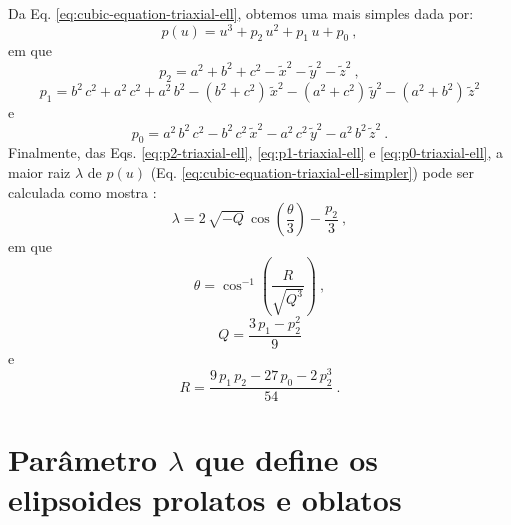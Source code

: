 Da Eq. \ref{eq:cubic-equation-triaxial-ell}, obtemos uma mais simples
dada por:
\begin{equation}
p(u) =  u^{3} + p_{2} \, u^{2} + p_{1} \, u + p_{0} \: ,
\label{eq:cubic-equation-triaxial-ell-simpler}
\end{equation}
em que
\begin{equation}
p_{2} = a^{2} + b^{2} + c^{2} - \tilde{x}^{2} - \tilde{y}^{2} - \tilde{z}^{2} \: ,
\label{eq:p2-triaxial-ell}
\end{equation}
\begin{equation}
p_{1} = b^{2} \, c^{2} + a^{2} \, c^{2} + a^{2} \, b^{2} 
- (b^{2} + c^{2}) \, \tilde{x}^{2}
- (a^{2} + c^{2}) \, \tilde{y}^{2} 
- (a^{2} + b^{2}) \, \tilde{z}^{2}
\label{eq:p1-triaxial-ell}
\end{equation}
e
\begin{equation}
p_{0} =  a^{2} \, b^{2} \, c^{2} - b^{2} \, c^{2} \, 
\tilde{x}^{2} - a^{2} \, c^{2} \, \tilde{y}^{2} - a^{2} \, 
b^{2} \, \tilde{z}^{2} \: .
\label{eq:p0-triaxial-ell}
\end{equation}
Finalmente, das Eqs. \ref{eq:p2-triaxial-ell}, 
\ref{eq:p1-triaxial-ell} e \ref{eq:p0-triaxial-ell},
a maior raiz $\lambda$ de $p(u)$ 
(Eq. \ref{eq:cubic-equation-triaxial-ell-simpler}) pode ser
calculada como mostra \citep{weisstein2017}:
\begin{equation}
\lambda = 2 \, \sqrt{-Q} \, \cos \left( \frac{\theta}{3}\right) - \frac{p_{2}}{3} \: ,
\label{eq:lambda-triaxial-ell}
\end{equation}
em que
\begin{equation}
\theta = \cos^{-1} \left( \frac{R}{\sqrt{Q^{3}}} \right) \: ,
\label{eq:theta-triaxial-ell}
\end{equation}
\begin{equation}
Q = \frac{3 \, p_{1} - p_{2}^{2}}{9}
\label{eq:Q-triaxial-ell}
\end{equation}
e
\begin{equation}
R = \frac{9 \, p_{1} \, p_{2} - 27 \, p_{0} - 2 \, p_{2}^{3}}{54} \: .
\label{eq:R-triaxial-ell}
\end{equation}

\section{Parâmetro $\lambda$ que define os elipsoides prolatos e oblatos}

